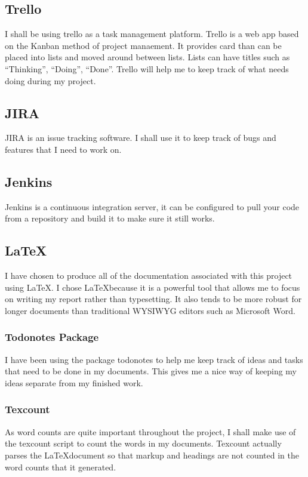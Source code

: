 \documentclass[12pt]{report}
\begin{document}
\subsection{Trello}
I shall be using trello as a task management platform. Trello is a web app based 
on the Kanban method of project manaement. It provides card than can be placed
into lists and moved around between lists. Lists can have titles such as
``Thinking'', ``Doing'', ``Done''. Trello will help me to keep track of what
needs doing during my project.

\subsection{JIRA}
JIRA is an issue tracking software. I shall use it to keep track of bugs and
features that I need to work on. 

\subsection{Jenkins}
Jenkins is a continuous integration server, it can be configured to pull your
code from a repository and build it to make sure it still works.  

\subsection{\LaTeX}
I have chosen to produce all of the documentation associated with this project
using \LaTeX. I chose \LaTeX because it is a powerful tool that allows me to
focus on writing my report rather than typesetting. It also tends to be more
robust for longer documents than traditional WYSIWYG editors such as Microsoft
Word.

\subsubsection{Todonotes Package}
I have been using the package todonotes to help me keep track of ideas and tasks 
that need to be done in my documents. This gives me a nice way of keeping my
ideas separate from my finished work.

\subsubsection{Texcount}
As word counts are quite important throughout the project, I shall make use of
the texcount script to count the words in my documents. Texcount actually parses
the \LaTeX document so that markup and headings are not counted in the word
counts that it generated. 
\end{document}
